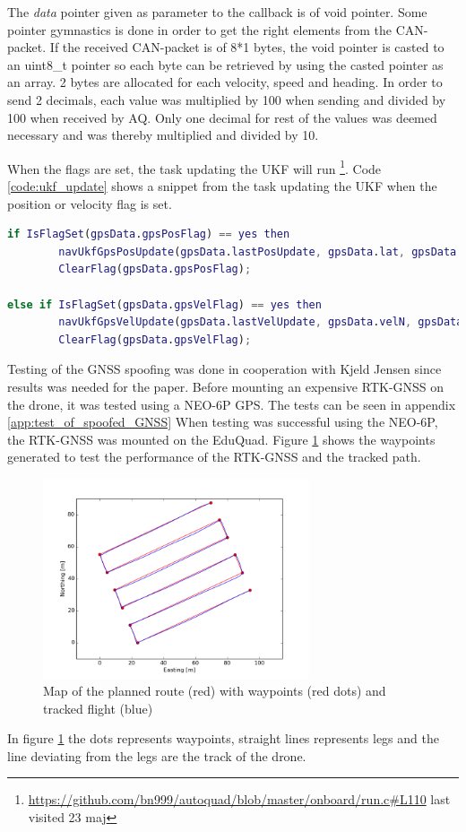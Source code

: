 The \textit{data} pointer given as parameter to the callback is of void pointer. Some pointer gymnastics is done in order to get the right elements from the CAN-packet. If the received CAN-packet is of 8*1 bytes, the void pointer is casted to an uint8\_t pointer so each byte can be retrieved by using the casted pointer as an array. 
2 bytes are allocated for each velocity, speed and heading. In order to send 2 decimals, each value was multiplied by 100 when sending and divided by 100 when received by \ac{AQ}.
Only one decimal for rest of the values was deemed necessary and was thereby multiplied and divided by 10.

When the flags are set, the task updating the \ac{UKF} will run \footnote{\url{https://github.com/bn999/autoquad/blob/master/onboard/run.c\#L110} last visited 23 maj}.
Code \ref{code:ukf_update} shows a snippet from the task updating the UKF when the position or velocity flag is set.
\begin{lstlisting}[language = Matlab, caption = Snippet of run.c as psudeocode which updates the UKF when position flag or velocity flag is set, label=code:ukf_update]
if IsFlagSet(gpsData.gpsPosFlag) == yes then
	    navUkfGpsPosUpdate(gpsData.lastPosUpdate, gpsData.lat, gpsData.lon, gpsData.height, ....);
	    ClearFlag(gpsData.gpsPosFlag);
	    
else if IsFlagSet(gpsData.gpsVelFlag) == yes then
	    navUkfGpsVelUpdate(gpsData.lastVelUpdate, gpsData.velN, gpsData.velE, ....);
	    ClearFlag(gpsData.gpsVelFlag);
\end{lstlisting}

Testing of the GNSS spoofing was done in cooperation with Kjeld Jensen since results was needed for the paper.
Before mounting an expensive RTK-GNSS on the drone, it was tested using a NEO-6P GPS. The tests can be seen in appendix \ref{app:test_of_spoofed_GNSS}
When testing was successful using the NEO-6P, the RTK-GNSS was mounted on the EduQuad.
Figure \ref{fig:rtk_test_route} shows the waypoints generated to test the performance of the RTK-GNSS and the tracked path.

\begin{figure}[H]
    \center
    \includegraphics[width=0.7\textwidth]{graphics/rtk_test_planner.png}
    \caption{ Map of the planned route (red) with waypoints (red dots) and tracked flight (blue) }
    \label{fig:rtk_test_route}
\end{figure}
In figure \ref{fig:rtk_test_route} the dots represents waypoints, straight lines represents legs and the line deviating from the legs are the track of the drone.

